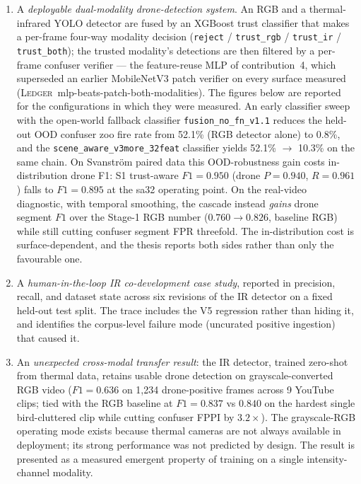\begin{enumerate}
    \item A \emph{deployable dual-modality drone-detection system}. An RGB and a thermal-infrared YOLO detector are fused by an XGBoost trust classifier that makes a per-frame four-way modality decision (\texttt{reject} / \texttt{trust\_rgb} / \texttt{trust\_ir} / \texttt{trust\_both}); the trusted modality's detections are then filtered by a per-frame confuser verifier --- the feature-reuse MLP of contribution~4, which superseded an earlier MobileNetV3 patch verifier on every surface measured (\textsc{Ledger}~mlp-beats-patch-both-modalities). The figures below are reported for the configurations in which they were measured. An early classifier sweep with the open-world fallback classifier \texttt{fusion\_no\_fn\_v1.1} reduces the held-out OOD confuser zoo fire rate from 52.1\% (RGB detector alone) to 0.8\%, and the \texttt{scene\_aware\_v3more\_32feat} classifier yields 52.1\% $\to$ 10.3\% on the same chain. On Svanstr\"om paired data this OOD-robustness gain costs in-distribution drone F1: S1 trust-aware $F1=0.950$ (drone $P=0.940$, $R=0.961$) falls to $F1=0.895$ at the sa32 operating point. On the real-video diagnostic, with temporal smoothing, the cascade instead \emph{gains} drone segment $F1$ over the Stage-1 RGB number ($0.760 \to 0.826$, baseline RGB) while still cutting confuser segment FPR threefold. The in-distribution cost is surface-dependent, and the thesis reports both sides rather than only the favourable one.
    \item A \emph{human-in-the-loop IR co-development case study}, reported in precision, recall, and dataset state across six revisions of the IR detector on a fixed held-out test split. The trace includes the V5 regression rather than hiding it, and identifies the corpus-level failure mode (uncurated positive ingestion) that caused it.
    \item An \emph{unexpected cross-modal transfer result}: the IR detector, trained zero-shot from thermal data, retains usable drone detection on grayscale-converted RGB video ($F1=0.636$ on 1{,}234 drone-positive frames across 9 YouTube clips; tied with the RGB baseline at $F1=0.837$ vs $0.840$ on the hardest single bird-cluttered clip while cutting confuser FPPI by $3.2\times$). The grayscale-RGB operating mode exists because thermal cameras are not always available in deployment; its strong performance was not predicted by design. The result is presented as a measured emergent property of training on a single intensity-channel modality.

\end{enumerate}
